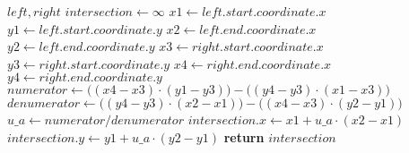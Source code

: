 \begin{algorithm}[!ht]
\caption{}
\label{alg:linesegmenintersection}
\begin{algorithmic}[1]
	\Require $\mathit{left}, \mathit{right}$
	\State $\mathit{intersection} \gets \infty$
	\State $\mathit{x1} \gets \mathit{left.start.coordinate.x}$
	\label{alg:linesegmenintersection-var-start}
	\State $\mathit{y1} \gets \mathit{left.start.coordinate.y}$
	\State $\mathit{x2} \gets \mathit{left.end.coordinate.x}$
	\State $\mathit{y2} \gets \mathit{left.end.coordinate.y}$
	\State $\mathit{x3} \gets \mathit{right.start.coordinate.x}$
	\State $\mathit{y3} \gets \mathit{right.start.coordinate.y}$
	\State $\mathit{x4} \gets \mathit{right.end.coordinate.x}$
	\State $\mathit{y4} \gets \mathit{right.end.coordinate.y}$
	\label{alg:linesegmenintersection-var-end}
	\State $\mathit{numerator} \gets \bigl((\mathit{x4} - \mathit{x3}) \cdot (\mathit{y1} - \mathit{y3})\bigr)
	 - \bigl((\mathit{y4} - \mathit{y3}) \cdot (\mathit{x1} - \mathit{x3})\bigr)$
	\label{alg:linesegmenintersection-intersect-start}
	\State $\mathit{denumerator} \gets \bigl((\mathit{y4} - \mathit{y3}) \cdot (\mathit{x2} - \mathit{x1})\bigr)
	 - \bigl((\mathit{x4} - \mathit{x3}) \cdot (\mathit{y2} - \mathit{y1})\bigr)$
	\State $\mathit{u\_a} \gets \mathit{numerator} / \mathit{denumerator}$
	\State $\mathit{intersection.x} \gets \mathit{x1} + \mathit{u\_a} \cdot (\mathit{x2} - \mathit{x1})$
	\State $\mathit{intersection.y} \gets \mathit{y1} + \mathit{u\_a} \cdot (\mathit{y2} - \mathit{y1})$
	\label{alg:linesegmenintersection-intersect-end}
	\State \textbf{return} $\mathit{intersection}$
	\label{alg:linesegmenintersection-return}
\end{algorithmic}
\end{algorithm}
